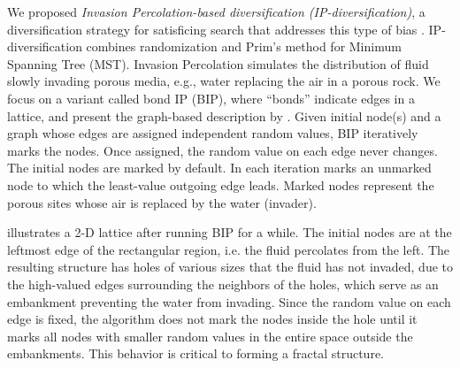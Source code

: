 We proposed \emph{Invasion Percolation-based diversification (IP-diversification)}, a
diversification strategy for satisficing search that addresses this type of bias \cite{Asai2017b}.
IP-diversification combines randomization and Prim's method \cite{prim1957shortest} for Minimum
Spanning Tree (MST).
% 
Invasion Percolation \cite{wilkinson1983invasion} simulates the distribution of fluid slowly
invading porous media, e.g., water replacing the air in a porous rock.  We focus on a variant called
bond IP (BIP), where ``bonds'' indicate edges in a lattice, and present the graph-based description
by \cite{barabasi1996invasion}.
% 
Given initial node(s) and a graph whose edges are assigned independent random values, BIP
iteratively marks the nodes.  Once assigned, the random value on each edge never changes.
The initial nodes are marked by default.  In each iteration marks an unmarked node to which the
least-value outgoing edge leads.  Marked nodes represent the porous sites whose air is replaced by
the water (invader).


 illustrates a 2-D lattice after running BIP for a while. The initial nodes are at the
leftmost edge of the rectangular region, i.e. the fluid percolates from the left. The resulting
structure has holes of various sizes that the fluid has not invaded, due to the high-valued edges
surrounding the neighbors of the holes, which serve as an embankment preventing the water from
invading. Since the random value on each edge is fixed, the algorithm does not mark the nodes inside
the hole until it marks all nodes with smaller random values in the entire space outside the
embankments.  This behavior is critical to forming a fractal structure.



